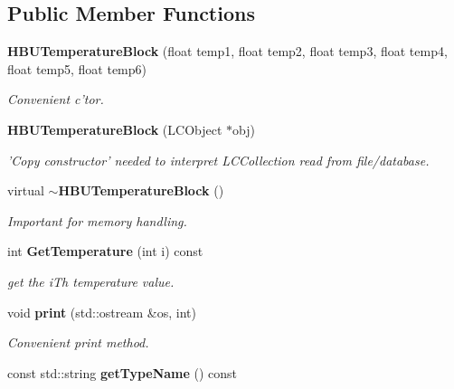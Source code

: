\subsection*{Public Member Functions}
\begin{DoxyCompactItemize}
\item 
{\bf H\-B\-U\-Temperature\-Block} (float temp1, float temp2, float temp3, float temp4, float temp5, float temp6)\label{classCALICE_1_1HBUTemperatureBlock_a31c53d802bbe9d3d4ab67b89bcea84d9}

\begin{DoxyCompactList}\small\item\em Convenient c'tor. \end{DoxyCompactList}\item 
{\bf H\-B\-U\-Temperature\-Block} (L\-C\-Object $\ast$obj)\label{classCALICE_1_1HBUTemperatureBlock_a66aa0df1cd4816dc5a05993af1fcb20f}

\begin{DoxyCompactList}\small\item\em 'Copy constructor' needed to interpret L\-C\-Collection read from file/database. \end{DoxyCompactList}\item 
virtual {\bf $\sim$\-H\-B\-U\-Temperature\-Block} ()\label{classCALICE_1_1HBUTemperatureBlock_a990d55a7677c5410beb42efb680d5a6d}

\begin{DoxyCompactList}\small\item\em Important for memory handling. \end{DoxyCompactList}\item 
int {\bf Get\-Temperature} (int i) const \label{classCALICE_1_1HBUTemperatureBlock_a651fe2deafbd2658dafa95457a2883c9}

\begin{DoxyCompactList}\small\item\em get the i\-Th temperature value. \end{DoxyCompactList}\item 
void {\bf print} (std\-::ostream \&os, int)\label{classCALICE_1_1HBUTemperatureBlock_a9c8cbfa1f0cce53c37f4713301ac9106}

\begin{DoxyCompactList}\small\item\em Convenient print method. \end{DoxyCompactList}\item 
const std\-::string {\bf get\-Type\-Name} () const \label{classCALICE_1_1HBUTemperatureBlock_ab15e48bcf14a740d241ec60e3ee03677}


\end{DoxyCompactItemize}

